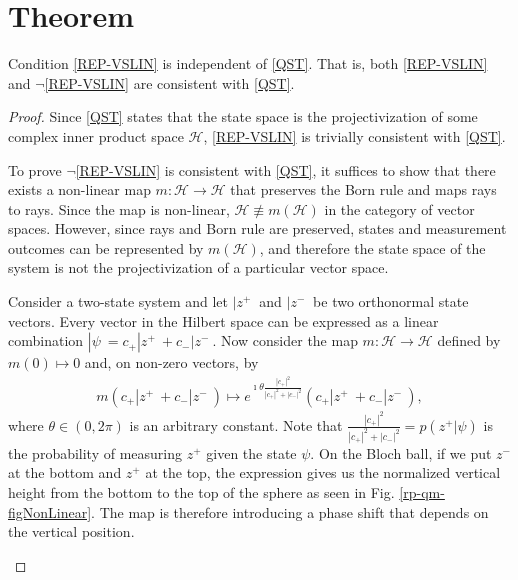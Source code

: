 \documentclass{techbrief}
\begin{document}
\section{Theorem}

\begin{thrm}
	Condition \ref{REP-VSLIN} is independent of \ref{QST}. That is, both \ref{REP-VSLIN} and $\neg$\ref{REP-VSLIN} are consistent with \ref{QST}.
\end{thrm}

\begin{proof}
	Since \ref{QST} states that the state space is the projectivization of some complex inner product space $\mathcal{H}$, \ref{REP-VSLIN} is trivially consistent with \ref{QST}.
	
	To prove $\neg$\ref{REP-VSLIN} is consistent with \ref{QST}, it suffices to show that there exists a non-linear map $m : \mathcal{H} \to \mathcal{H}$ that preserves the Born rule and maps rays to rays. Since the map is non-linear, $\mathcal{H} \nequiv m(\mathcal{H})$ in the category of vector spaces. However, since rays and Born rule are preserved, states and measurement outcomes can be represented by $m(\mathcal{H})$, and therefore the state space of the system is not the projectivization of a particular vector space.
	
	Consider a two-state system and let $|z^+\>$ and $|z^-\>$ be two orthonormal state vectors. Every vector in the Hilbert space can be expressed as a linear combination $|\psi\> = c_{+} | z^+ \> + c_{-} | z^- \>$. Now consider the map $m : \mathcal{H} \to \mathcal{H}$ defined by $m(0) \mapsto 0$ and, on non-zero vectors, by
	\begin{equation}
		\begin{aligned}
			m(c_{+} | z^+ \> + c_{-} | z^- \>) \mapsto e^{\imath \theta \frac{|c_{+}|^2}{|c_{+}|^2+|c_{-}|^2}} ( c_{+} | z^+ \> + c_{-}  | z^- \>),
		\end{aligned}
	\end{equation}
	where $\theta \in (0,2\pi)$ is an arbitrary constant. Note that $\frac{|c_{+}|^2}{|c_{+}|^2+|c_{-}|^2} = p(z^+|\psi)$ is the probability of measuring $z^+$ given the state $\psi$. On the Bloch ball, if we put $z^-$ at the bottom and $z^+$ at the top, the expression gives us the normalized vertical height from the bottom to the top of the sphere as seen in Fig. \ref{rp-qm-figNonLinear}. The map is therefore introducing a phase shift that depends on the vertical position.

\begin{figure}[h]
	\centering
	

\end{figure}
\end{proof}
\end{document}
